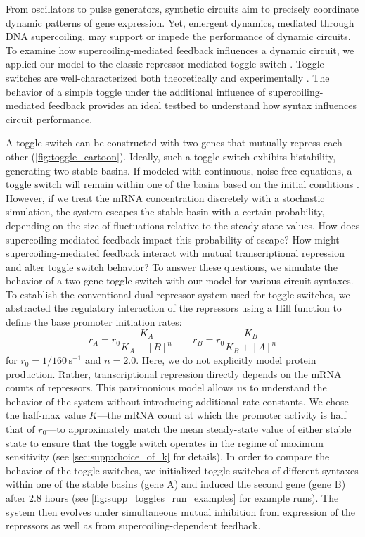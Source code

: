 \documentclass[11pt]{article} %
\begin{document}
From oscillators to pulse generators, synthetic circuits aim to precisely coordinate dynamic patterns of gene expression. Yet, emergent dynamics, mediated through DNA supercoiling, may support or impede the performance of dynamic circuits. To examine how supercoiling-mediated feedback influences a dynamic circuit, we applied our model to the classic repressor-mediated toggle switch \parencite{gardnerConstructionGeneticToggle2000}. Toggle switches are well-characterized both theoretically \parencite{gardnerConstructionGeneticToggle2000} and experimentally \parencite{gardnerConstructionGeneticToggle2000,yeungBiophysicalConstraintsArising2017,zhuSyntheticMultistabilityMammalian2021}. The behavior of a simple toggle under the additional influence of supercoiling-mediated feedback provides an ideal testbed to understand how syntax influences circuit performance.

A toggle switch can be constructed with two genes that mutually repress each other (\cref{fig:toggle_cartoon}). Ideally, such a toggle switch exhibits bistability, generating two stable basins. If modeled with continuous, noise-free equations, a toggle switch will remain within one of the basins based on the initial conditions \parencite{gardnerConstructionGeneticToggle2000}. However, if we treat the mRNA concentration discretely with a stochastic simulation, the system escapes the stable basin with a certain probability, depending on the size of fluctuations relative to the steady-state values. How does supercoiling-mediated feedback impact this probability of escape? How might supercoiling-mediated feedback interact with mutual transcriptional repression and alter toggle switch behavior?
To answer these questions, we simulate the behavior of a two-gene toggle switch with our model for various circuit syntaxes. To establish the conventional dual repressor system used for toggle switches, we abstracted the regulatory interaction of the repressors using a Hill function to define the base promoter initiation rates:
\begin{equation}
    r_A = r_0 \frac{K_A}{K_A + [B]^n} \qquad r_B = r_0 \frac{K_B}{K_B + [A]^n}
\end{equation}
for \(r_0 = 1/160 \,\text{s}^{-1}\) and \(n = 2.0\). Here, we do not explicitly model protein production. Rather, transcriptional repression directly depends on the mRNA counts of repressors. This parsimonious model allows us to understand the behavior of the system without introducing additional rate constants. We chose the half-max value \(K\)---the mRNA count at which the promoter activity is half that of \(r_0\)---to approximately match the mean steady-state value of either stable state to ensure that the toggle switch operates in the regime of maximum sensitivity (see \cref{sec:supp:choice_of_k} for details). In order to compare the behavior of the toggle switches, we initialized toggle switches of different syntaxes within one of the stable basins (gene A) and induced the second gene (gene B) after 2.8 hours (see \cref{fig:supp_toggles_run_examples} for example runs). The system then evolves under simultaneous mutual inhibition from expression of the repressors as well as from supercoiling-dependent feedback.
\end{document}
